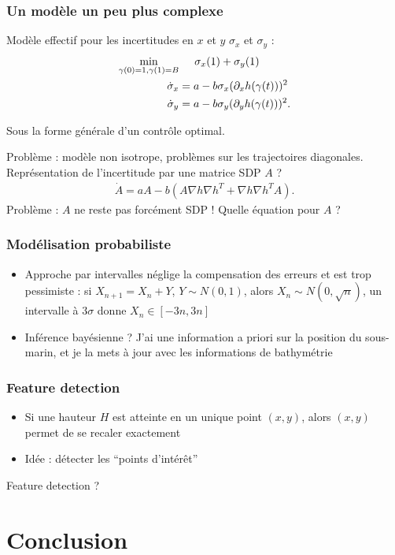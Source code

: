 \documentclass[11pt]{beamer}
\begin{document}
\begin{frame}
  \frametitle{Un modèle un peu plus complexe}
Modèle effectif pour les incertitudes en $x$ et $y$ $\sigma_{x}$ et
$\sigma_{y}$ :
\begin{align*}
  \min_{\gamma(0) = 1, \gamma(1) = B} & \hspace{.5cm}\sigma_{x}(1) + \sigma_{y}(1)\\
  \dot \sigma_{x} &= a - b \sigma_{x} (\partial_{x} h(\gamma(t)))^{2}\\
  \dot \sigma_{y} &= a - b \sigma_{y} (\partial_{y} h(\gamma(t)))^{2}.
\end{align*}

Sous la forme générale d'un contrôle optimal.

Problème : modèle non isotrope, problèmes sur les trajectoires
diagonales. Représentation de l'incertitude par une matrice SDP $A$ ?
\begin{align*}
  \dot A = a A - b (A \nabla h \nabla h^{T} + \nabla h \nabla h^{T} A).
\end{align*}
Problème : $A$ ne reste pas forcément SDP ! Quelle équation pour $A$ ?
\end{frame}
\begin{frame}
  \frametitle{Modélisation probabiliste}
  \begin{itemize}
  \item Approche par intervalles néglige la compensation des erreurs
    et est trop pessimiste : si $X_{n+1} = X_{n} + Y$,
    $Y \sim N(0, 1)$, alors $X_{n} \sim N(0, \sqrt n)$, un intervalle
    à $3\sigma$ donne $X_{n} \in [-3n, 3n]$
  \item Inférence bayésienne ? J'ai une information a priori sur la
    position du sous-marin, et je la mets à jour avec les informations
    de bathymétrie
  \end{itemize}
\end{frame}
\begin{frame}
  \frametitle{Feature detection}
  \begin{itemize}
  \item Si une hauteur $H$ est atteinte en un unique point $(x,y)$,
    alors $(x,y)$ permet de se recaler exactement
  \item Idée : détecter les ``points d'intérêt'' 
  \end{itemize}
\end{frame}
Feature detection ?


\section{Conclusion}
\end{document}
